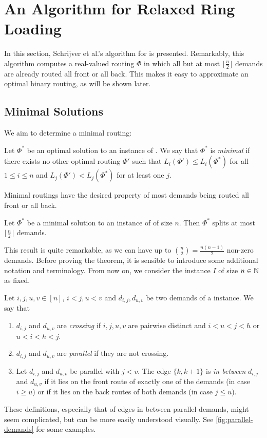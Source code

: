 \section{An Algorithm for Relaxed Ring Loading}
\label{sec:relaxed-ring-loading}

In this section, Schrijver et al.'s \cite{schrijver99} algorithm for \RRL is presented.
Remarkably, this algorithm computes a real-valued routing $\Phi$ in which all but at most $\lfloor \frac{n}{2} \rfloor$ demands are already routed all front or all back.
This makes it easy to approximate an optimal binary routing, as will be shown later.

\subsection{Minimal Solutions}

We aim to determine a minimal routing:

\begin{definition}
	Let $\Phi^\ast$ be an optimal solution to an instance of \RRL.
	We say that $\Phi^\ast$ is \emph{minimal} if there exists no other optimal routing $\Phi'$ such that $L_i(\Phi') \leq L_i(\Phi^\ast)$ for all $1 \leq i \leq n$ and $L_j(\Phi') < L_j(\Phi^\ast)$ for at least one $j$.
\end{definition}

Minimal routings have the desired property of most demands being routed all front or all back.
\begin{theorem}
	\label{theo:number-of-splits}
	Let $\Phi^\ast$ be a minimal solution to an instance of \RRL of size $n$.
	Then $\Phi^\ast$ splits at most $\lfloor \frac{n}{2} \rfloor$ demands.
\end{theorem}

This result is quite remarkable, as we can have up to $\binom{n}{2} = \frac{n(n-1)}{2}$ non-zero demands.
Before proving the theorem, it is sensible to introduce some additional notation and terminology.
From now on, we consider the \RRL instance $I$ of size $n \in \mathbb{N}$ as fixed.
\begin{definition}
	Let $i, j, u, v \in [n]$, $i < j, u < v$ and $d_{i,j}, d_{u, v}$ be two demands of a \RRL instance.
	We say that
	\begin{enumerate}
		\item $d_{i, j}$ and $d_{u, v}$ are \emph{crossing} if $i, j, u, v$ are pairwise distinct and $i < u < j < h$ or $u < i < h < j$.
		\item $d_{i, j}$ and $d_{u, v}$ are \emph{parallel} if they are not crossing.
		\item Let $d_{i, j}$ and $d_{u, v}$ be parallel with $j < v$.
		The edge $\{k, k+1\}$ is \emph{in between} $d_{i,j}$ and $d_{u, v}$ if it lies on the front route of exactly one of the demands (in case $i \geq u$) or if it lies on the back routes of both demands (in case $j \leq u$).
	\end{enumerate}
\end{definition}
These definitions, especially that of edges in between parallel demands, might seem complicated, but can be more easily understood visually.
See \cref{fig:parallel-demands} for some examples.

